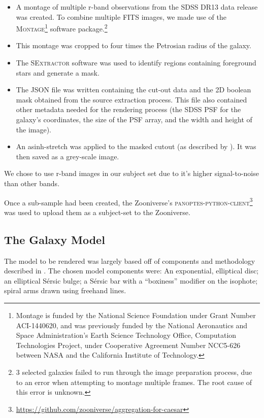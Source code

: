 \documentclass[../main.tex]{subfiles}
\begin{document}
\begin{itemize}
\item A montage of multiple r-band observations from the SDSS DR13 data release was created. To combine multiple FITS images, we made use of the \textsc{Montage}\footnote{Montage is funded by the National Science Foundation under Grant Number ACI-1440620, and was previously funded by the National Aeronautics and Space Administration's Earth Science Technology Office, Computation Technologies Project, under Cooperative Agreement Number NCC5-626 between NASA and the California Institute of Technology.} software package.\footnote{3 selected galaxies failed to run through the image preparation process, due to an error when attempting to montage multiple frames. The root cause of this error is unknown.}
\item This montage was cropped to four times the Petrosian radius of the galaxy.
\item The \textsc{SExtractor} software \citep{source-extractor} was used to identify regions containing foreground stars and generate a mask.
\item The JSON file was written containing the cut-out data and the 2D boolean mask obtained from the source extraction process. This file also contained other metadata needed for the rendering process (the SDSS PSF for the galaxy's coordinates, the size of the PSF array, and the width and height of the image).
\item An asinh-stretch was applied to the masked cutout (as described by \citealt{Lupton2003:astro-ph/0312483v1}). It was then saved as a grey-scale image.
\end{itemize}

We chose to use r-band images in our subject set due to it's higher signal-to-noise than other bands.

Once a sub-sample had been created, the Zooniverse's \textsc{panoptes-python-client}\footnote{\url{https://github.com/zooniverse/aggregation-for-caesar}} was used to upload them as a subject-set to the Zooniverse.


\subsection{The Galaxy Model}
\label{section:galaxy-model}

The model to be rendered was largely based off of components and methodology described in \citet{galfit-paper}. The chosen model components were: An exponential, elliptical disc; an elliptical S\'ersic bulge; a S\'ersic bar with a ``boxiness'' modifier on the isophote; spiral arms drawn using freehand lines.
\end{document}
